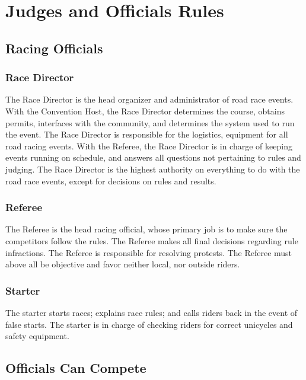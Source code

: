 \chapter{Judges and Officials Rules}

\section{Racing Officials}

\subsection{Race Director}

The Race Director is the head organizer and administrator of road race events.
With the Convention Host, the Race Director determines the course, obtains permits, interfaces with the community, and determines the system used to run the event.
The Race Director is responsible for the logistics, equipment for all road racing events.
With the Referee, the Race Director is in charge of keeping events running on schedule, and answers all questions not pertaining to rules and judging.
The Race Director is the highest authority on everything to do with the road race events, except for decisions on rules and results.

\subsection{Referee}

The Referee is the head racing official, whose primary job is to make sure the competitors follow the rules.
The Referee makes all final decisions regarding rule infractions. 
The Referee is responsible for resolving protests.
The Referee must above all be objective and favor neither local, nor outside riders.

\subsection{Starter}

The starter starts races; explains race rules; and calls riders back in the event of false starts.
The starter is in charge of checking riders for correct unicycles and safety equipment.

\section{Officials Can Compete}

